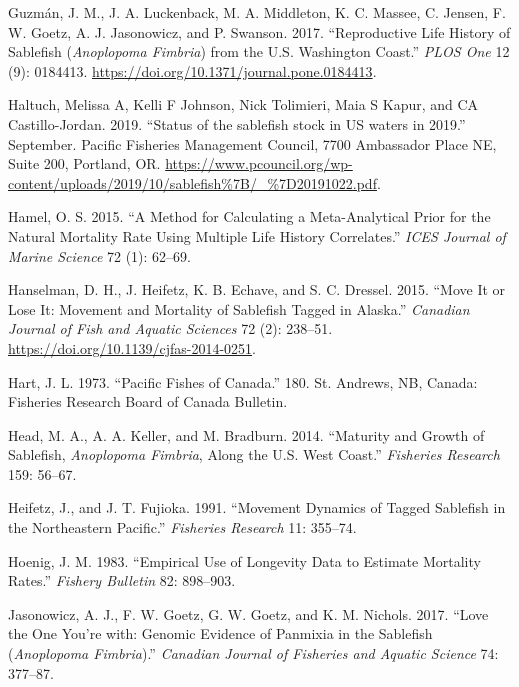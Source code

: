 \documentclass[11pt,
  english,
  a4paper,
]{article}
\newlength{\cslhangindent}
\newenvironment{cslreferences}%
  {\setlength{\parindent}{0pt}%
  \everypar{\setlength{\hangindent}{\cslhangindent}}\ignorespaces}%
  {\par}
\begin{document}
\begin{cslreferences}
\leavevmode\hypertarget{ref-guzman2017}{}%
Guzmán, J. M., J. A. Luckenback, M. A. Middleton, K. C. Massee, C. Jensen, F. W. Goetz, A. J. Jasonowicz, and P. Swanson. 2017. ``Reproductive Life History of Sablefish (\emph{Anoplopoma Fimbria}) from the U.S. Washington Coast.'' \emph{PLOS One} 12 (9): 0184413. \url{https://doi.org/10.1371/journal.pone.0184413}.

\leavevmode\hypertarget{ref-Haltuch2019b}{}%
Haltuch, Melissa A, Kelli F Johnson, Nick Tolimieri, Maia S Kapur, and CA Castillo-Jordan. 2019. ``Status of the sablefish stock in US waters in 2019.'' September. Pacific Fisheries Management Council, 7700 Ambassador Place NE, Suite 200, Portland, OR. \url{https://www.pcouncil.org/wp-content/uploads/2019/10/sablefish\%7B/_\%7D20191022.pdf}.

\leavevmode\hypertarget{ref-hamel2015icesjms}{}%
Hamel, O. S. 2015. ``A Method for Calculating a Meta-Analytical Prior for the Natural Mortality Rate Using Multiple Life History Correlates.'' \emph{ICES Journal of Marine Science} 72 (1): 62--69.

\leavevmode\hypertarget{ref-hanselman2015cjfasmove}{}%
Hanselman, D. H., J. Heifetz, K. B. Echave, and S. C. Dressel. 2015. ``Move It or Lose It: Movement and Mortality of Sablefish Tagged in Alaska.'' \emph{Canadian Journal of Fish and Aquatic Sciences} 72 (2): 238--51. \url{https://doi.org/10.1139/cjfas-2014-0251}.

\leavevmode\hypertarget{ref-hart1973}{}%
Hart, J. L. 1973. ``Pacific Fishes of Canada.'' 180. St. Andrews, NB, Canada: Fisheries Research Board of Canada Bulletin.

\leavevmode\hypertarget{ref-head2014fishres}{}%
Head, M. A., A. A. Keller, and M. Bradburn. 2014. ``Maturity and Growth of Sablefish, \emph{Anoplopoma Fimbria}, Along the U.S. West Coast.'' \emph{Fisheries Research} 159: 56--67.

\leavevmode\hypertarget{ref-heifetz1991fishresmovement}{}%
Heifetz, J., and J. T. Fujioka. 1991. ``Movement Dynamics of Tagged Sablefish in the Northeastern Pacific.'' \emph{Fisheries Research} 11: 355--74.

\leavevmode\hypertarget{ref-Hoenig1983}{}%
Hoenig, J. M. 1983. ``Empirical Use of Longevity Data to Estimate Mortality Rates.'' \emph{Fishery Bulletin} 82: 898--903.

\leavevmode\hypertarget{ref-jasonowicz2017cjfaslove}{}%
Jasonowicz, A. J., F. W. Goetz, G. W. Goetz, and K. M. Nichols. 2017. ``Love the One You're with: Genomic Evidence of Panmixia in the Sablefish (\emph{Anoplopoma Fimbria}).'' \emph{Canadian Journal of Fisheries and Aquatic Science} 74: 377--87.


\end{cslreferences}
\end{document}
